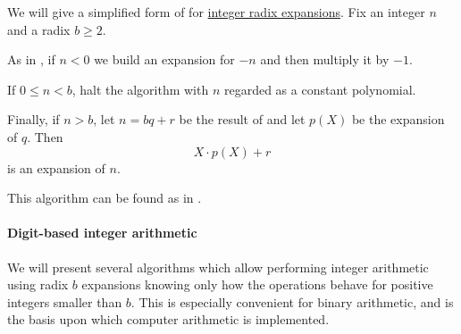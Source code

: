 \begin{algorithm}\label{alg:integer_radix_expansion}
  We will give a simplified form of  for \hyperref[def:integer_radix_expansion]{integer radix expansions}. Fix an integer \( n \) and a radix \( b \geq 2 \).

  \begin{thmenum}
     As in , if \( n < 0 \) we build an expansion for \( -n \) and then multiply it by \( -1 \).

     If \( 0 \leq n < b \), halt the algorithm with \( n \) regarded as a constant polynomial.

     Finally, if \( n > b \), let \( n = bq + r \) be the result of  and let \( p(X) \) be the expansion of \( q \). Then
    \begin{equation*}
      X \cdot p(X) + r
    \end{equation*}
    is an expansion of \( n \).
  \end{thmenum}
\end{algorithm}
\begin{comments}
  \item This algorithm can be found as  in \cite{notebook:code}.
\end{comments}

\paragraph{Digit-based integer arithmetic}\hfill

We will present several algorithms which allow performing integer arithmetic using radix \( b \) expansions knowing only how the operations behave for positive integers smaller than \( b \). This is especially convenient for binary arithmetic, and is the basis upon which computer arithmetic is implemented.

